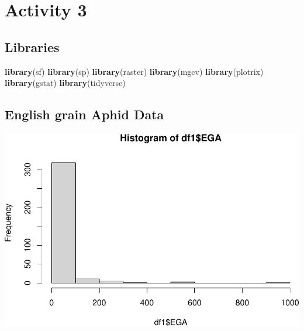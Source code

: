 \documentclass[
]{book}
\newenvironment{Shaded}{\begin{snugshade}}{\end{snugshade}}
\newcommand{\CommentTok}[1]{\textcolor[rgb]{0.56,0.35,0.01}{\textit{#1}}}
\newcommand{\DecValTok}[1]{\textcolor[rgb]{0.00,0.00,0.81}{#1}}
\newcommand{\FunctionTok}[1]{\textcolor[rgb]{0.13,0.29,0.53}{\textbf{#1}}}
\newcommand{\NormalTok}[1]{#1}
\newcommand{\OtherTok}[1]{\textcolor[rgb]{0.56,0.35,0.01}{#1}}
\newcommand{\SpecialCharTok}[1]{\textcolor[rgb]{0.81,0.36,0.00}{\textbf{#1}}}
\newcommand{\StringTok}[1]{\textcolor[rgb]{0.31,0.60,0.02}{#1}}
\begin{document}
\hypertarget{activity-3}{%
\chapter{Activity 3}\label{activity-3}}

\hypertarget{libraries-1}{%
\section{Libraries}\label{libraries-1}}

\begin{Shaded}
\begin{Highlighting}[]
\FunctionTok{library}\NormalTok{(sf)}
\FunctionTok{library}\NormalTok{(sp)}
\FunctionTok{library}\NormalTok{(raster)}
\FunctionTok{library}\NormalTok{(mgcv)}
\FunctionTok{library}\NormalTok{(plotrix)}
\FunctionTok{library}\NormalTok{(gstat)}
\FunctionTok{library}\NormalTok{(tidyverse)}
\end{Highlighting}
\end{Shaded}

\hypertarget{english-grain-aphid-data}{%
\section{English grain Aphid Data}\label{english-grain-aphid-data}}

\begin{Shaded}
\end{Shaded}

\includegraphics{_main_files/figure-latex/unnamed-chunk-24-1.pdf}
\end{document}
